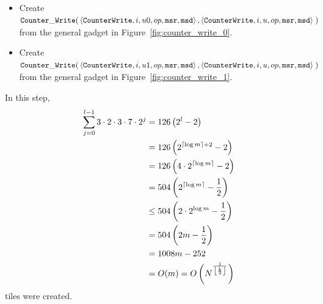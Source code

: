 \begin{itemize}
\begin{itemize}
            \item Create
            $\begin{aligned}[t]
                \cwrite(& \left\langle {\tt CounterWrite}, i, u0, \inc, {\tt msr}, {\tt msd} \right\rangle,
                          \left\langle {\tt CounterWrite}, i, u,  \inc, {\tt msr}, {\tt msd} \right\rangle \;)
            \end{aligned}$ \\ from the general gadget in Figure~\ref{fig:counter_write_0}.

            \item Create
            $\begin{aligned}[t]
                \cwrite(& \left\langle {\tt CounterWrite}, i,  u1, \inc, {\tt msr}, {\tt msd} \right\rangle,
                          \left\langle {\tt CounterWrite}, i,  u,  \inc, {\tt msr}, {\tt msd} \right\rangle \;)
            \end{aligned}$ \\ from the general gadget in Figure~\ref{fig:counter_write_1}.
    \end{itemize}

    In this step,
    \begin{align*}
        \sum_{j=0}^{l - 1} 3 \cdot 2 \cdot 3 \cdot 7 \cdot 2^j &=    126 \left( 2^{l} - 2                        \right) \\
                                                               &=    126 \left( 2^{\ceil*{\log m} + 2}     - 2   \right) \\
                                                               &=    126 \left( 4 \cdot 2^{\ceil*{\log m}} - 2   \right) \\
                                                               &=    504 \left( 2^{\ceil*{\log m}} - \frac{1}{2} \right) \\
                                                               &\leq 504 \left( 2 \cdot 2^{\log m} - \frac{1}{2} \right) \\
                                                               &=    504 \left( 2m - \frac{1}{2}                 \right) \\
                                                               &=    1008m - 252                                         \\
                                                               &=    O(m) = O\left( \upperbound \right)                  \\
    \end{align*}
    tiles were created.


\end{itemize}
